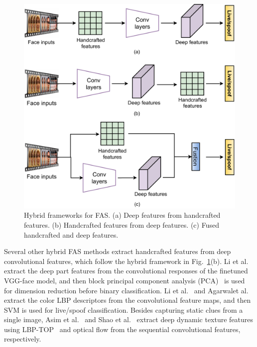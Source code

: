 \documentclass[10pt,journal,compsoc]{IEEEtran}
\begin{document}
\begin{figure}
\centering
\includegraphics[scale=0.47]{Figures/hybrid.pdf}
  \caption{ 
   Hybrid frameworks for FAS. (a) Deep features from handcrafted features. (b) Handcrafted features from deep features. (c) Fused handcrafted and deep features.
  }
\label{fig:hybrid}
\end{figure}


Several other hybrid FAS methods extract handcrafted features from deep convolutional features, which follow the hybrid framework in Fig.~\ref{fig:hybrid}(b). Li et al.~\cite{Li2017An} extract the deep part features from the convolutional responses of the finetuned VGG-face model, and then block principal component analysis (PCA)~\cite{wold1987principal} is used for dimension reduction before binary classification. Li et al.~\cite{li2019face} and Agarwalet al.~\cite{agarwal2019chif} extract the color LBP descriptors from the convolutional
feature maps, and then SVM is used for live/spoof classification. Besides capturing static clues from a single image, Asim et al.~\cite{asim2017cnn} and Shao et al.~\cite{shao2018joint} extract deep dynamic texture features using LBP-TOP~\cite{zhao2007dynamic} and optical flow from the sequential convolutional features, respectively.
\end{document}
